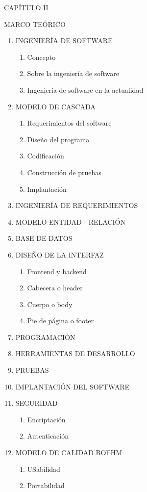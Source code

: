 \documentclass[12pt,letterpaper]{article}
\begin{document}
\noindent CAPÍTULO II

\noindent MARCO TEÓRICO

\begin{enumerate}[nosep, label=2.\arabic*., left = 0pt .. \parindent]
    \item INGENIERÍA DE SOFTWARE
    \begin{enumerate}[nosep, label=2.\arabic{enumi}.\arabic*., left = 0pt .. \parindent]
    	\item Concepto
        \item Sobre la ingeniería de software
        \item Ingeniería de software en la actualidad
    \end{enumerate}
    \item MODELO DE CASCADA
    \begin{enumerate}[nosep, label=2.\arabic{enumi}.\arabic*., left = 0pt .. \parindent]
    	\item Requerimientos del software
        \item Diseño del programa
        \item Codificación
        \item Construcción de pruebas
        \item Implantación
    \end{enumerate}
    \item INGENIERÍA DE REQUERIMIENTOS
    \item MODELO ENTIDAD - RELACIÓN
    \item BASE DE DATOS
    \item DISEÑO DE LA INTERFAZ
    \begin{enumerate}[nosep, label=2.\arabic{enumi}.\arabic*., left = 0pt .. \parindent]
    	\item Frontend y backend
        \item Cabecera o header
        \item Cuerpo o body
        \item Pie de página o footer
    \end{enumerate}
    \item PROGRAMACIÓN
    \item HERRAMIENTAS DE DESARROLLO
    \item PRUEBAS
    \item IMPLANTACIÓN DEL SOFTWARE
    \item SEGURIDAD
    \begin{enumerate}[nosep, label=2.\arabic{enumi}.\arabic*., left = 0pt .. \parindent]
    	\item Encriptación
        \item Autenticación
	\end{enumerate}
	\item MODELO DE CALIDAD BOEHM
	\begin{enumerate}[nosep, label=2.\arabic{enumi}.\arabic*., left = 0pt .. \parindent]
		\item USabilidad
		\item Portabilidad
	\end{enumerate}
    
\end{enumerate}
\end{document}
